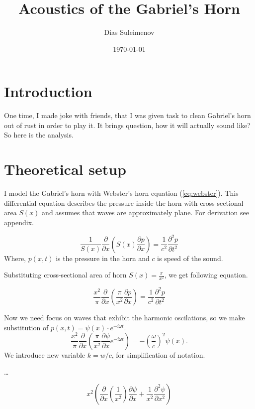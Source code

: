 \documentclass{article}
\title{Acoustics of the Gabriel's Horn}
\author{Dias Suleimenov}
\date{\today}
\begin{document}
\maketitle

\section*{Introduction}
One time, I made joke with friends, that I was given task to clean Gabriel's horn out of rust in order to play it. It brings question, how it will actually sound like? So here is the analysis.

\section*{Theoretical setup}
I model the Gabriel's horn with Webster's horn equation (\ref{eq:webster}). This differential equation describes the pressure inside the horn with cross-sectional area $S(x)$ and assumes that waves are approximately plane. For derivation see appendix.

\begin{equation}
    \frac{1}{S(x)} \frac{\partial}{\partial x} \left(S(x) \frac{\partial p}{\partial x}\right) = \frac{1}{c^2} \frac{\partial^2 p}{\partial t^2}
\end{equation}
Where, $p(x, t)$ is the pressure in the horn and $c$ is speed of the sound.

Substituting cross-sectional area of horn $S(x) = \frac{\pi}{x^2}$, we get following equation.

\begin{equation}
    \frac{x^2}{\pi} \frac{\partial}{\partial x} \left(\frac{\pi}{x^2}  \frac{\partial p}{\partial x}\right) = \frac{1}{c^2} \frac{\partial^2 p}{\partial t^2}
\end{equation}

Now we need focus on waves that exhibit the harmonic oscilations, so we make substitution of $p(x, t) = \psi(x) \cdot e^{-i \omega t}$.
\begin{equation}
    \frac{x^2}{\pi} \frac{\partial}{\partial x} \left(\frac{\pi}{x^2}  \frac{\partial \psi}{\partial x} e^{-i \omega t}\right) = - \left(\frac{\omega}{c}\right)^2 \psi(x).
\end{equation}
We introduce new variable $k = w/c$, for simplification of notation. 

\dots

\begin{equation}
    x^2 \left( \frac{\partial}{\partial x} \left( \frac{1}{x^2} \right) \frac{\partial \psi}{\partial x} + \frac{1}{x^2} \frac{\partial^2 \psi}{\partial x^2}\right)
\end{equation}
\end{document}
